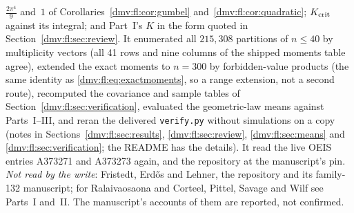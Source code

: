 \documentclass[11pt,letterpaper]{article}
\numberwithin{equation}{section}
\theoremstyle{definition}\newtheorem{definition}[theorem]{Definition}
\theoremstyle{remark}\newtheorem{remark}[theorem]{Remark}
\newcommand{\code}[1]{\texttt{\detokenize{#1}}}
\newcommand{\file}[1]{\nolinkurl{#1}}
\begin{document}
$\tfrac{2\pi^4}9$ and~$1$ of Corollaries~\ref{dmv:fl:cor:gumbel}
and~\ref{dmv:fl:cor:quadratic}; $K_{\rm crit}$ against its integral; and
Part~I's $K$ in the form quoted in Section~\ref{dmv:fl:sec:review}. It
enumerated all $215{,}308$ partitions of $n\le40$ by multiplicity vectors
(all 41 rows and nine columns of the shipped moments table agree), extended
the exact moments to $n=300$ by forbidden-value products (the same identity
as \eqref{dmv:fl:eq:exactmoments}, so a range extension, not a second
route), recomputed the covariance and sample tables of
Section~\ref{dmv:fl:sec:verification}, evaluated the geometric-law means
against Parts~I--III, and reran the delivered \file{verify.py} without
simulations on a copy (notes in Sections~\ref{dmv:fl:sec:results},
\ref{dmv:fl:sec:review}, \ref{dmv:fl:sec:means} and
\ref{dmv:fl:sec:verification}; the README has the details). It read the
live OEIS entries A373271 and A373273 again, and the repository at the
manuscript's pin. \emph{Not read by the write}: Fristedt, Erd\H{o}s and
Lehner, the \code{math} repository and its family-132 manuscript; for
Ralaivaosaona and Corteel, Pittel, Savage and Wilf see Parts~I and~II. The
manuscript's accounts of them are reported, not confirmed.
\end{document}
